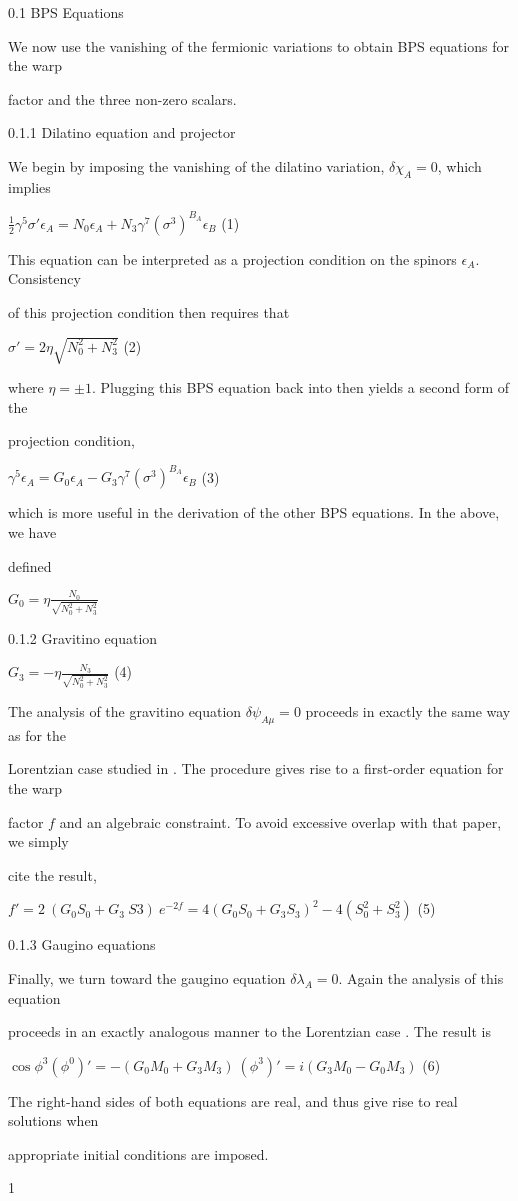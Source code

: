 \documentclass[a4paper,12pt]{article}
\begin{document}
0.1 BPS Equations

We now use the vanishing of the fermionic variations to obtain BPS equations for the warp

factor and the three non-zero scalars.

0.1.1 Dilatino equation and projector

We begin by imposing the vanishing of the dilatino variation, $\delta\chi_{A}=0$, which implies
\begin{center}
$\displaystyle \frac{1}{2}\gamma^{5}\sigma'\epsilon_{A}=N_{0}\epsilon_{A}+N_{3}\gamma^{7}(\sigma^{3})^{B_{A}}\epsilon_{B}$   (1)
\end{center}
This equation can be interpreted as a projection condition on the spinors $\epsilon_{A}$. Consistency

of this projection condition then requires that
\begin{center}
$\sigma'=2\eta\sqrt{N_{0}^{2}+N_{3}^{2}}$   (2)
\end{center}
where $\eta = \pm 1$. Plugging this BPS equation back into then yields a second form of the

projection condition,
\begin{center}
$\gamma^{5}\epsilon_{A}=G_{0}\epsilon_{A}-G_{3}\gamma^{7}(\sigma^{3})^{B_{A}}\epsilon_{B}$   (3)
\end{center}
which is more useful in the derivation of the other BPS equations. In the above, we have

defined

$G_{0}=\displaystyle \eta\frac{N_{0}}{\sqrt{N_{0}^{2}+N_{3}^{2}}}$

0.1.2 Gravitino equation

$G_{3}=-\displaystyle \eta\frac{N_{3}}{\sqrt{N_{0}^{2}+N_{3}^{2}}}$ (4)

The analysis of the gravitino equation $\delta\psi_{A\mu}=0$ proceeds in exactly the same way as for the

Lorentzian case studied in . The procedure gives rise to a first-order equation for the warp

factor $f$ and an algebraic constraint. To avoid excessive overlap with that paper, we simply

cite the result,
\begin{center}
$f'=2\ (G_{0}S_{0}+G_{3}\ S3)\ e^{-2f}=4(G_{0}S_{0}+G_{3}S_{3})^{2}-4(S_{0}^{2}+S_{3}^{2})$   (5)
\end{center}
0.1.3 Gaugino equations

Finally, we turn toward the gaugino equation $\delta\lambda_{A}=0$. Again the analysis of this equation

proceeds in an exactly analogous manner to the Lorentzian case . The result is
\begin{center}
$\cos\phi^{3}(\phi^{0})'=-(G_{0}M_{0}+G_{3}M_{3})\ (\phi^{3})'=i(G_{3}M_{0}-G_{0}M_{3})$   (6)
\end{center}
The right-hand sides of both equations are real, and thus give rise to real solutions when

appropriate initial conditions are imposed.

1
\end{document}
